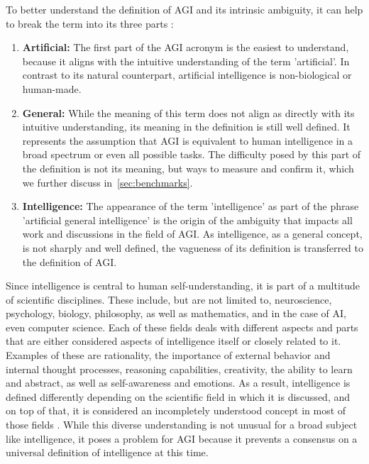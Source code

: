 To better understand the definition of AGI and its intrinsic ambiguity, it can help to break the term into its three parts \citep{russell_artificial_2021}:
\begin{enumerate}
    \item \textbf{Artificial:} The first part of the AGI acronym is the easiest to understand, because it aligns with the intuitive understanding of the term 'artificial'. In contrast to its natural counterpart, artificial intelligence is non-biological or human-made.
    \item \textbf{General:} While the meaning of this term does not align as directly with its intuitive understanding, its meaning in the definition is still well defined. It represents the assumption that AGI is equivalent to human intelligence in a broad spectrum or even all possible tasks. The difficulty posed by this part of the definition is not its meaning, but ways to measure and confirm it, which we further discuss in~\cref{sec:benchmarks}.
    \item \textbf{Intelligence:} The appearance of the term 'intelligence' as part of the phrase 'artificial general intelligence' is the origin of the ambiguity that impacts all work and discussions in the field of AGI. As intelligence, as a general concept, is not sharply and well defined, the vagueness of its definition is transferred to the definition of AGI.
\end{enumerate}
Since intelligence is central to human self-understanding, it is part of a multitude of scientific disciplines.
These include, but are not limited to, neuroscience, psychology, biology, philosophy, as well as mathematics, and in the case of AI, even computer science.
Each of these fields deals with different aspects and parts that are either considered aspects of intelligence itself or closely related to it.
Examples of these are rationality, the importance of external behavior and internal thought processes, reasoning capabilities, creativity, the ability to learn and abstract, as well as self-awareness and emotions.
As a result, intelligence is defined differently depending on the scientific field in which it is discussed, and on top of that, it is considered an incompletely understood concept in most of those fields \citep{hutson_agi_nodate}.
While this diverse understanding is not unusual for a broad subject like intelligence, it poses a problem for AGI because it prevents a consensus on a universal definition of intelligence at this time.\\

